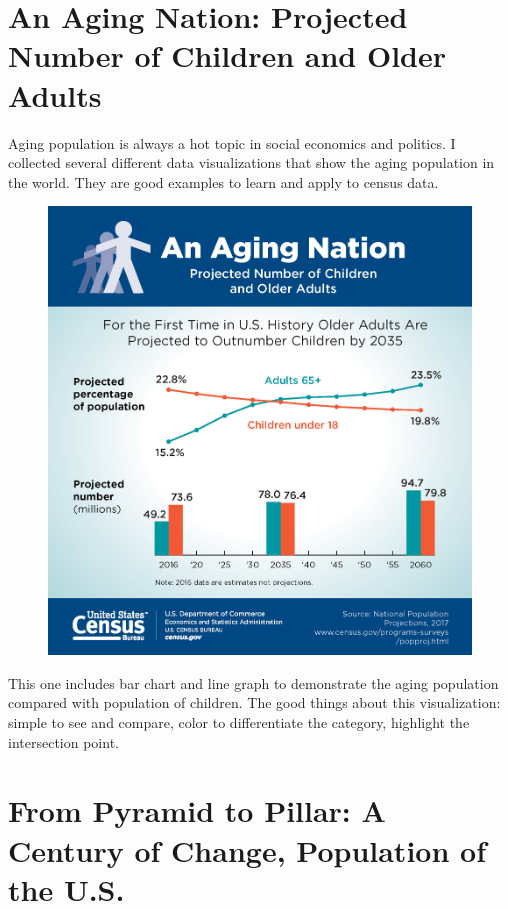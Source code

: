 \documentclass[]{book}
\theoremstyle{definition}
\theoremstyle{definition}
\theoremstyle{definition}
\theoremstyle{remark}
\begin{document}
\section{An Aging Nation: Projected Number of Children and Older
Adults}\label{an-aging-nation-projected-number-of-children-and-older-adults}

\citep{aging_nation} Aging population is always a hot topic in social
economics and politics. I collected several different data
visualizations that show the aging population in the world. They are
good examples to learn and apply to census data.

\begin{figure}
\centering
\includegraphics{images/aging_nation.jpg}
\caption{}
\end{figure}

This one includes bar chart and line graph to demonstrate the aging
population compared with population of children. The good things about
this visualization: simple to see and compare, color to differentiate
the category, highlight the intersection point.

\section{From Pyramid to Pillar: A Century of Change, Population of the
U.S.}\label{from-pyramid-to-pillar-a-century-of-change-population-of-the-u.s.}
\end{document}
